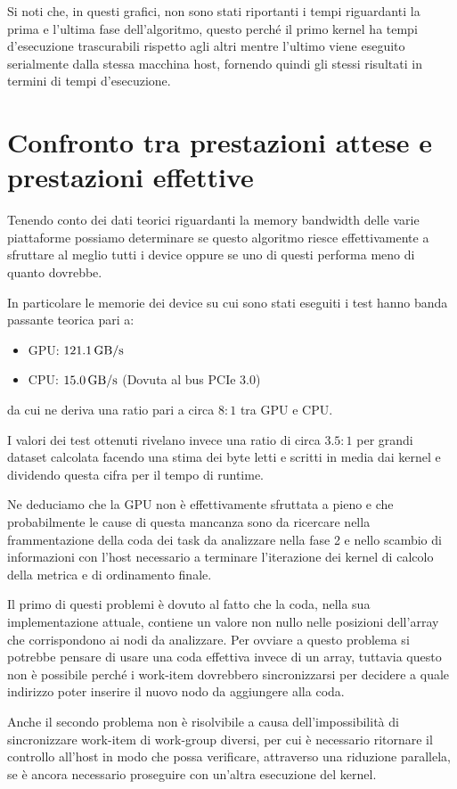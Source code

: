 \newpage
Si noti che, in questi grafici, non sono stati riportanti i tempi riguardanti la prima e l'ultima fase dell'algoritmo, questo perché il primo kernel ha tempi d'esecuzione trascurabili rispetto agli altri mentre l'ultimo viene eseguito serialmente dalla stessa macchina host, fornendo quindi gli stessi risultati in termini di tempi d'esecuzione.

\section{Confronto tra prestazioni attese e prestazioni effettive}
Tenendo conto dei dati teorici riguardanti la memory bandwidth delle varie piattaforme possiamo determinare se questo algoritmo riesce effettivamente a sfruttare al meglio tutti i device oppure se uno di questi performa meno di quanto dovrebbe.

In particolare le memorie dei device su cui sono stati eseguiti i test hanno banda passante teorica pari a:
\begin{itemize}
	\item GPU: $\SI{121.1}{\giga\byte/\second}$
	\item CPU: $\SI{15.0}{\giga\byte/\second}$ (Dovuta al bus PCIe 3.0)
\end{itemize}
da cui ne deriva una ratio pari a circa $8:1$ tra GPU e CPU.

I valori dei test ottenuti rivelano invece una ratio di circa $3.5:1$ per grandi dataset calcolata facendo una stima dei byte letti e scritti in media dai kernel e dividendo questa cifra per il tempo di runtime.

Ne deduciamo che la GPU non è effettivamente sfruttata a pieno e che probabilmente le cause di questa mancanza sono da ricercare nella frammentazione della coda dei task da analizzare nella fase 2 e nello scambio di informazioni con l'host necessario a terminare l'iterazione dei kernel di calcolo della metrica e di ordinamento finale.

Il primo di questi problemi è dovuto al fatto che la coda, nella sua implementazione attuale, contiene un valore non nullo nelle posizioni dell'array che corrispondono ai nodi da analizzare. Per ovviare a questo problema si potrebbe pensare di usare una coda effettiva invece di un array, tuttavia questo non è possibile perché i work-item dovrebbero sincronizzarsi per decidere a quale indirizzo poter inserire il nuovo nodo da aggiungere alla coda.

Anche il secondo problema non è risolvibile a causa dell'impossibilità di sincronizzare work-item di work-group diversi, per cui è necessario ritornare il controllo all'host in modo che possa verificare, attraverso una riduzione parallela, se è ancora necessario proseguire con un'altra esecuzione del kernel. 


